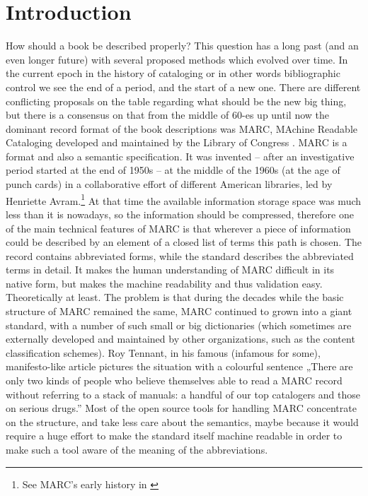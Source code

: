 \section{Introduction}
How should a book be described properly? This question has a long past (and an even longer future) with several proposed methods which evolved over time. In the current epoch in the history of cataloging or in other words bibliographic control we see the end of a period, and the start of a new one. There are different conflicting proposals on the table regarding what should be the new big thing, but there is a consensus on that from the middle of 60-es up until now the dominant record format of the book descriptions was MARC, MAchine Readable Cataloging developed and maintained by the Library of Congress \cite{marc21}. MARC is a format and also a semantic specification. It was invented -- after an investigative period started at the end of 1950s -- at the middle of the 1960s (at the age of punch cards) in a collaborative effort of different American libraries, led by Henriette Avram.\footnote{See MARC's early history in \cite{avram1975}} At that time the available information storage space was much less than it is nowadays, so the information should be compressed, therefore one of the main technical features of MARC is that wherever a piece of information could be described by an element of a closed list of terms this path is chosen. The record contains abbreviated forms, while the standard describes the abbreviated terms in detail. It makes the human understanding of MARC difficult in its native form, but makes the machine readability and thus validation easy. Theoretically at least. The problem is that during the decades while the basic structure of MARC remained the same, MARC continued to grown into a giant standard, with a number of such small or big dictionaries (which sometimes are externally developed and maintained by other organizations, such as the content classification schemes). Roy Tennant, in his famous (infamous for some), manifesto-like article \cite{tennant2002} pictures the situation with a colourful sentence „There are only two kinds of people who believe themselves able to read a MARC record without referring to a stack of manuals: a handful of our top catalogers and those on serious drugs.” Most of the open source tools for handling MARC concentrate on the structure, and take less care about the semantics, maybe because it would require a huge effort to make the standard itself machine readable in order to make such a tool aware of the meaning of the abbreviations.

